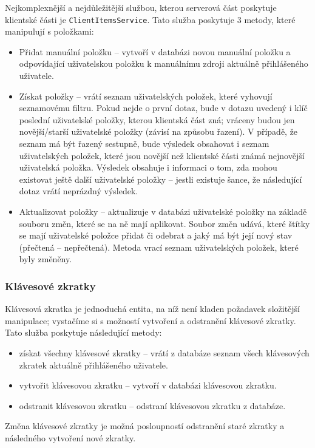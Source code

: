 Nejkomplexnější a nejdůležitější službou, kterou serverová část poskytuje klientské části je \verb|ClientItemsService|.
Tato služba poskytuje 3 metody, které manipulují s položkami:
\begin{itemize}
	\item Přidat manuální položku -- vytvoří v databázi novou manuální položku a odpovídající uživatelskou položku k manuálnímu zdroji aktuálně přihlášeného uživatele.
	\item Získat položky -- vrátí seznam uživatelských položek, které vyhovují seznamovému filtru.
		Pokud nejde o první dotaz, bude v dotazu uvedený i klíč poslední uživatelské položky, kterou klientská část zná; vráceny budou jen novější/starší uživatelské položky (závisí na způsobu řazení).
		V případě, že seznam má být řazený sestupně, bude výsledek obsahovat i seznam uživatelských položek, které jsou novější než klientské části známá nejnovější uživatelská položka.
		Výsledek obsahuje i informaci o tom, zda mohou existovat ještě další uživatelské položky -- jestli existuje šance, že následující dotaz vrátí neprázdný výsledek.
	\item Aktualizovat položky -- aktualizuje v databázi uživatelské položky na základě souboru změn, které se na ně mají aplikovat.
		Soubor změn udává, které štítky se mají uživatelské položce přidat či odebrat a jaký má být její nový stav (přečtená -- nepřečtená).
		Metoda vrací seznam uživatelských položek, které byly změněny.
\end{itemize}

\subsubsection{Klávesové zkratky}

Klávesová zkratka je jednoduchá entita, na níž není kladen požadavek složitější manipulace; vystačíme si s možností vytvoření a odstranění klávesové zkratky.
Tato služba poskytuje následující metody:
\begin{itemize}
	\item získat všechny klávesové zkratky -- vrátí z databáze seznam všech klávesových zkratek aktuálně přihlášeného uživatele.
	\item vytvořit klávesovou zkratku -- vytvoří v databázi klávesovou zkratku.
	\item odstranit klávesovou zkratku -- odstraní klávesovou zkratku z databáze.
\end{itemize}

Změna klávesové zkratky je možná posloupností odstranění staré zkratky a následného vytvoření nové zkratky.

